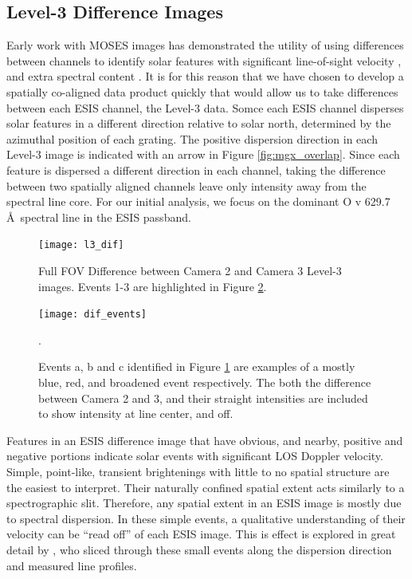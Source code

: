     \subsection{Level-3 Difference Images}
    	Early work with MOSES images has demonstrated the utility of using differences between channels to identify solar features with significant line-of-sight velocity \citep{Fox2010,FoxPhD,RustPhD,Rust2019}, and extra spectral content \citep{RustPhD, Rust2019,Parker2021}.  
    	It is for this reason that we have chosen to develop a spatially co-aligned data product quickly that would allow us to take differences between each ESIS channel, the Level-3 data.
    	Somce each ESIS channel disperses solar features in a different direction relative to solar north, determined by the azimuthal position of each grating.
    	The positive dispersion direction in each Level-3 image is indicated with an arrow in Figure \ref{fig:mgx_overlap}.
    	Since each feature is dispersed a different direction in each channel, taking the difference between two spatially aligned channels leave only intensity away from the spectral line core.
    	For our initial analysis, we focus on the dominant O {\sc v} 629.7 \AA \ spectral line in the ESIS passband.
   		
   		\begin{figure}[htb!]
   			\centering
   			\texttt{[image: l3\_dif]}
   			\caption{Full FOV Difference between Camera 2 and Camera 3 Level-3 images.  Events 1-3 are highlighted in Figure \ref{fig:dif_events}.}
   			\label{fig:l3_dif}
   		\end{figure}
   	
 		\begin{figure}[htb!]
   			\centering
   			\texttt{[image: dif\_events]}
   			\caption{Events a, b and c identified in Figure \ref{fig:l3_dif} are examples of a mostly blue, red, and broadened event respectively. The both the difference between Camera 2 and 3, and their straight intensities are included to show intensity at line center, and off.
   			}
   			\label{fig:dif_events}. 
   		\end{figure}

    	Features in an ESIS difference image that have obvious, and nearby, positive and negative portions indicate solar events with significant LOS Doppler velocity.
    	Simple, point-like, transient brightenings with little to no spatial structure are the easiest to interpret.
    	Their naturally confined spatial extent acts similarly to a spectrographic slit.
    	Therefore, any spatial extent in an ESIS image is mostly due to spectral dispersion.
    	In these simple events, a qualitative understanding of their velocity can be ``read off'' of each ESIS image.
    	This is effect is explored in great detail by \citet{Rust2019}, who sliced through these small events along the dispersion direction and measured line profiles.
    	
